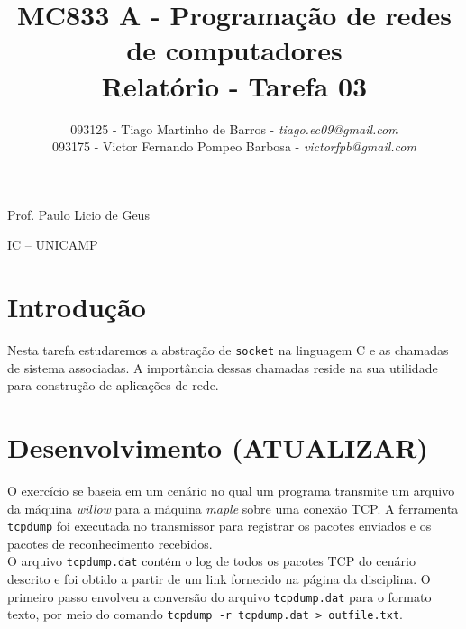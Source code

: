 \documentclass[a4paper,10pt]{article}
\begin{document}


\title{MC833 A - Programação de redes de computadores\\
Relatório - Tarefa 03}

\author {   093125 - Tiago Martinho de Barros - \textit{tiago.ec09@gmail.com}\\
            093175 - Victor Fernando Pompeo Barbosa - \textit{victorfpb@gmail.com}}


\maketitle

\centerline{Prof. Paulo Licio de Geus}
\centerline{IC -- UNICAMP}

\vspace{2cm}
\tableofcontents
    
\newpage
\section{Introdução}
\hspace{14pt}

    Nesta tarefa estudaremos a abstração de {\tt socket} na linguagem C e as chamadas de sistema associadas. A importância dessas chamadas reside na sua utilidade para construção de aplicações de rede.


\section{Desenvolvimento (ATUALIZAR)}

O exercício se baseia em um cenário no qual um programa transmite um arquivo da máquina \textit{willow} para a máquina \textit{maple} sobre uma conexão TCP. A ferramenta {\tt tcpdump} foi executada no transmissor para registrar os pacotes enviados e os pacotes de reconhecimento recebidos.\\

O arquivo {\tt tcpdump.dat} contém o log de todos os pacotes TCP do cenário descrito e foi obtido a partir de um link fornecido na página da disciplina. O primeiro passo envolveu a conversão do arquivo {\tt tcpdump.dat} para o formato texto, por meio do comando {\tt tcpdump -r tcpdump.dat > outfile.txt}. \\
\end{document}
